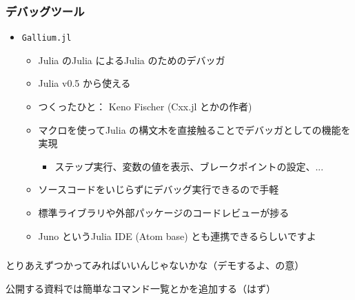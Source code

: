 \documentclass[dvipdfmx]{beamer}
\begin{document}
\begin{frame}[containsverbatim]
    \frametitle{デバッグツール}
    \begin{itemize}
        \item \verb|Gallium.jl|
        \begin{itemize}
            \item Julia のJulia によるJulia のためのデバッガ
            \item Julia v0.5 から使える
            \item つくったひと： Keno Fischer (Cxx.jl とかの作者)
            \item マクロを使ってJulia の構文木を直接触ることでデバッガとしての機能を実現
            \begin{itemize}
                \item ステップ実行、変数の値を表示、ブレークポイントの設定、...
            \end{itemize}
            \item ソースコードをいじらずにデバッグ実行できるので手軽
            \item 標準ライブラリや外部パッケージのコードレビューが捗る
            \item Juno というJulia IDE (Atom base) とも連携できるらしいですよ
        \end{itemize}
\end{itemize}
\end{frame}

\begin{frame}
    \frametitle{}
    とりあえずつかってみればいいんじゃないかな（デモするよ、の意）

    公開する資料では簡単なコマンド一覧とかを追加する（はず）
\end{frame}
\end{document}
